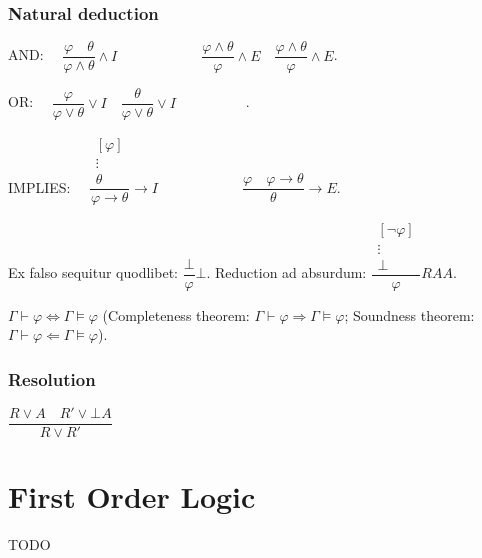 \documentclass[]{article}
\begin{document}
\subsubsection{Natural deduction}

\noindent AND: $\hspace{1em} \dfrac{\varphi \hspace{1em} \theta}{\varphi \land \theta}\land I \hspace{5em} \hspace{1em} \dfrac{\varphi \land \theta}{\varphi}\land E \hspace{1em} \dfrac{\varphi \land \theta}{\varphi}\land E$.

\noindent OR: $\hspace{1em} \dfrac{\varphi}{\varphi \lor \theta}\lor I \hspace{1em} \dfrac{\theta}{\varphi \lor \theta}\lor I \hspace{5em} $.

\noindent IMPLIES: $\hspace{1em} \dfrac{\begin{array}{c} [\varphi] \\ \vdots \\ \theta \end{array}}{\varphi \rightarrow \theta} \rightarrow I \hspace{5em} \hspace{1em} \dfrac{\varphi \hspace{1em} \varphi \rightarrow \theta}{\theta} \rightarrow E $.

\noindent Ex falso sequitur quodlibet: $\dfrac{\bot}{\varphi}\bot$. Reduction ad absurdum: $\dfrac{\begin{array}{c} [\neg \varphi] \\ \vdots \\ \bot \end{array}}{\varphi} RAA$.


\noindent $\Gamma \vdash \varphi \iff \Gamma \vDash \varphi$ (Completeness theorem: $\Gamma \vdash \varphi \Rightarrow \Gamma \vDash \varphi$; Soundness theorem: $\Gamma \vdash \varphi \Leftarrow \Gamma \vDash \varphi$).

\subsubsection{Resolution}


\noindent $\dfrac{R \lor A \hspace{1em} R' \lor \bot A}{R \lor R'}$

\section{First Order Logic}

TODO
\end{document}
